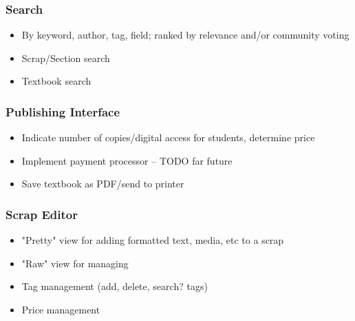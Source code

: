\documentclass[letterpaper, 10pt, draftclsnofoot, onecolumn]{IEEEtran}
\begin{document}
{{\subsubsection[System feature 4: [ insert feature name here
{]}]{\rmfamily\bfseries\color{black} Search
}
\begin{itemize}
\item By keyword, author, tag, field; ranked by relevance and/or community voting
\item Scrap/Section search
\item Textbook search
\end{itemize}

\subsubsection[System feature 5: [ Publishing Interface
{]}]{\rmfamily\bfseries\color{black} Publishing Interface
}
\begin{itemize}
\item Indicate number of copies/digital access for students, determine price
\item Implement payment processor -- TODO far future
\item Save textbook as PDF/send to printer
\end{itemize}

\subsubsection[System feature 6: [ Scrap Editor
{]}]{\rmfamily\bfseries\color{black}  Scrap Editor}
\begin{itemize}
\item "Pretty" view for adding formatted text, media, etc to a scrap
\item "Raw" view for managing
\item Tag management (add, delete, search? tags)
\item Price management
\end{itemize}

\bigskip

\bigskip
{}


}}
\end{document}
